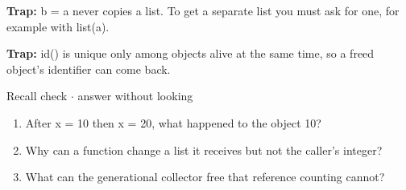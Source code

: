 \documentclass[11pt]{article}
\begin{document}
\begin{keepsection}
\begin{keepsection}
\begin{notebox}\textbf{Trap:} b = a never copies a list. To get a separate list you must ask for one, for example with list(a).\end{notebox}

\begin{notebox}\textbf{Trap:} id() is unique only among objects alive at the same time, so a freed object’s identifier can come back.\end{notebox}

\begin{recallbox}{Recall check \ensuremath{\cdot} answer without looking}
\begin{enumerate}
\item After x = 10 then x = 20, what happened to the object 10?
\item Why can a function change a list it receives but not the caller’s integer?
\item What can the generational collector free that reference counting cannot?
\end{enumerate}

\end{recallbox}
\end{keepsection}
\end{keepsection}
\end{document}

